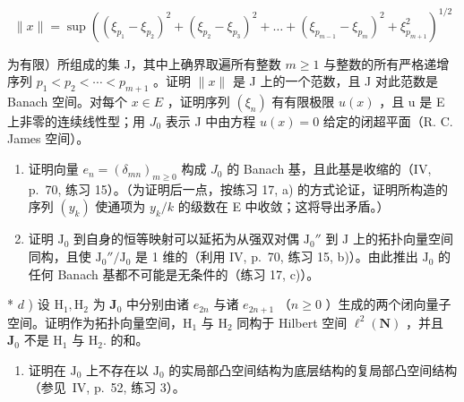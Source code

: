 \[
\| x \| = \sup \left(\left(\xi_ {p _ {1}} - \xi_ {p _ {2}}\right) ^ {2} + \left(\xi_ {p _ {2}} - \xi_ {p _ {3}}\right) ^ {2} + \dots + \left(\xi_ {p _ {m - 1}} - \xi_ {p _ {m}}\right) ^ {2} + \xi_ {p _ {m + 1}} ^ {2}\right) ^ {1 / 2}
\]

为有限）所组成的集 J，其中上确界取遍所有整数 \(m \geqslant 1\) 与整数的所有严格递增序列 \(p_{1} < p_{2} < \cdots < p_{m+1}\) 。证明 \(\|x\|\) 是 J 上的一个范数，且 J 对此范数是 Banach 空间。对每个 \(x \in E\) ，证明序列 \((\xi_{n})\) 有有限极限 \(u(x)\) ，且 u 是 E 上非零的连续线性型；用 \(J_{0}\) 表示 J 中由方程 \(u(x) = 0\) 给定的闭超平面（R. C. James 空间）。

\begin{enumerate}
\def\labelenumi{\alph{enumi})}
\setcounter{enumi}{1}
\item
  证明向量 \(e_n = (\delta_{mn})_{m \geq 0}\) 构成 \(J_0\) 的 Banach 基，且此基是收缩的（IV, p.~70, 练习 15）。（为证明后一点，按练习 17, a) 的方式论证，证明所构造的序列 \((y_k)\) 使通项为 \(y_k / k\) 的级数在 E 中收敛；这将导出矛盾。）
\item
  证明 \(\mathrm{J}_0\) 到自身的恒等映射可以延拓为从强双对偶 \(\mathrm{J}_0''\) 到 \(\mathrm{J}\) 上的拓扑向量空间同构，且使 \(\mathrm{J}_0'' / \mathrm{J}_0\) 是 1 维的（利用 IV, p.~70, 练习 15, b)）。由此推出 \(\mathrm{J}_0\) 的任何 Banach 基都不可能是无条件的（练习 17, c)）。
\end{enumerate}

* \(d\) ) 设 \(\mathrm{H}_1,\mathrm{H}_2\) 为 \(\mathbf{J}_0\) 中分别由诸 \(e_{2n}\) 与诸 \(e_{2n + 1}\) （\(n\geqslant 0\) ）生成的两个闭向量子空间。证明作为拓扑向量空间，\(\mathrm{H}_{1}\) 与 \(\mathrm{H}_{2}\) 同构于 Hilbert 空间 \(\ell^2 (\mathbf{N})\) ，并且 \(\mathbf{J}_0\) 不是 \(\mathrm{H}_1\) 与 \(\mathrm{H}_2.\) 的和。

\begin{enumerate}
\def\labelenumi{\alph{enumi})}
\setcounter{enumi}{4}
\tightlist
\item
  证明在 \(\mathrm{J}_0\) 上不存在以 \(\mathrm{J}_0\) 的实局部凸空间结构为底层结构的复局部凸空间结构（参见~IV, p.~52, 练习 3）。
\end{enumerate}

